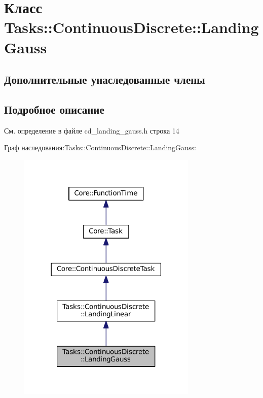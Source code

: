 \hypertarget{class_tasks_1_1_continuous_discrete_1_1_landing_gauss}{}\section{Класс Tasks\+:\+:Continuous\+Discrete\+:\+:Landing\+Gauss}
\label{class_tasks_1_1_continuous_discrete_1_1_landing_gauss}
\subsection*{Дополнительные унаследованные члены}


\subsection{Подробное описание}


См. определение в файле cd\+\_\+landing\+\_\+gauss.\+h строка 14



Граф наследования\+:Tasks\+:\+:Continuous\+Discrete\+:\+:Landing\+Gauss\+:
\nopagebreak
\begin{figure}[H]
\begin{center}
\leavevmode
\includegraphics[width=242pt]{class_tasks_1_1_continuous_discrete_1_1_landing_gauss__inherit__graph}
\end{center}
\end{figure}



